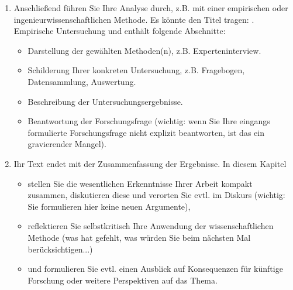\begin{enumerate}
\item Anschließend führen Sie Ihre Analyse durch, z.B. mit einer empirischen oder ingenieurwissenschaftlichen Methode. Es könnte den Titel tragen: . Empirische Untersuchung\grqq{} und enthält folgende Abschnitte:
  \begin{itemize}
  \item Darstellung der gewählten Methoden(n), z.B. Experteninterview.
  \item Schilderung Ihrer konkreten Untersuchung, z.B. Fragebogen, Datensammlung, Auswertung.
  \item Beschreibung der Untersuchungsergebnisse.
  \item Beantwortung der Forschungsfrage (wichtig: wenn Sie Ihre eingangs formulierte Forschungsfrage nicht explizit beantworten, ist das ein gravierender Mangel).
  \end{itemize}

\item Ihr Text endet mit der Zusammenfassung der Ergebnisse. In diesem Kapitel
  \begin{itemize}
  \item stellen Sie die wesentlichen Erkenntnisse Ihrer Arbeit kompakt zusammen, diskutieren diese und verorten Sie evtl. im Diskurs (wichtig: Sie formulieren hier keine neuen Argumente),
  \item reflektieren Sie selbstkritisch Ihre Anwendung der wissenschaftlichen Methode (was hat gefehlt, was würden Sie beim nächsten Mal berücksichtigen...)
  \item und formulieren Sie evtl. einen Ausblick auf Konsequenzen für künftige Forschung oder weitere Perspektiven auf das Thema.
  \end{itemize}
\end{enumerate}

